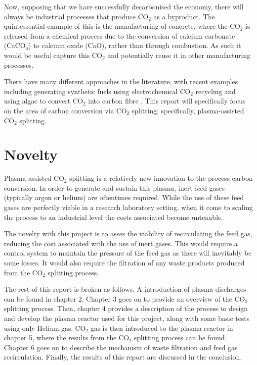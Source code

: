 Now, supposing that we have successfully decarbonised the economy, there will always be industrial processes that produce CO$_2$ as a byproduct. The quintessential example of this is the manufacturing of concrete, where the CO$_2$ is released from a chemical process due to the conversion of calcium carbonate (CaCO$_3$) to calcium oxide (CaO), rather than through combustion. As such it would be useful capture this CO$_2$ and potentially reuse it in other manufacturing processes. 

There have many different approaches in the literature, with recent examples including generating synthetic fuels using electrochemical CO$_2$ recycling \cite{ross_et_al_2019} and using algae to convert CO$_2$ into carbon fibre \cite{arnold_et_al_2018}. This report will specifically focus on the area of carbon conversion via CO$_2$ splitting; specifically, plasma-assisted CO$_2$ splitting.


\section{Novelty}

Plasma-assisted CO$_2$ splitting is a relatively new innovation to the process carbon conversion. In order to generate and sustain this plasma, inert feed gases (typically argon or helium) are oftentimes required. While the use of these feed gases are perfectly viable in a research laboratory setting, when it come to scaling the process to an industrial level the costs associated become untenable.

The novelty with this project is to asses the viability of recirculating the feed gas, reducing the cost associated with the use of inert gases. This would require a control system to maintain the pressure of the feed gas as there will inevitably be some losses. It would also require the filtration of any waste products produced from the CO$_2$ splitting process.

The rest of this report is broken as follows. A introduction of plasma discharges can be found in chapter 2. Chapter 3 goes on to provide an overview of the CO$_2$ splitting process. Then, chapter 4 provides a description of the process to design and develop the plasma reactor used for this project, along with some basic tests using only Helium gas. CO$_2$ gas is then introduced to the plasma reactor in chapter 5, where the results from the CO$_2$ splitting process can be found. Chapter 6 goes on to describe the mechanism of waste filtration and feed gas recirculation. Finally, the results of this report are discussed in the conclusion.